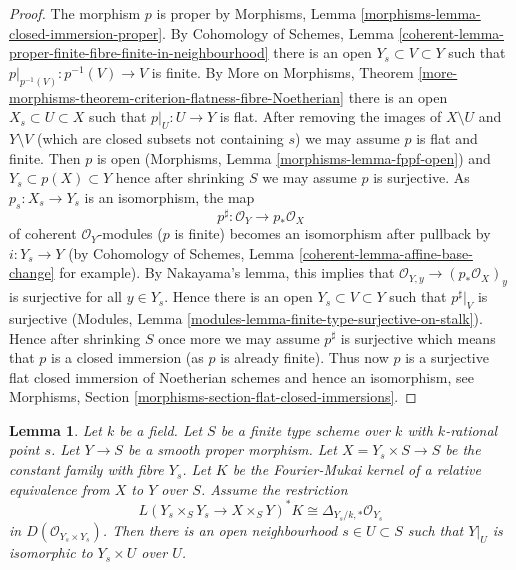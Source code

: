 \documentclass{stacks-project}
\theoremstyle{plain}
\newtheorem{lemma}[subsection]{Lemma}
\theoremstyle{definition}
\theoremstyle{remark}
\numberwithin{equation}{subsection}
\begin{document}
\begin{proof}
The morphism $p$ is proper by Morphisms, Lemma
\ref{morphisms-lemma-closed-immersion-proper}.
By Cohomology of Schemes, Lemma
\ref{coherent-lemma-proper-finite-fibre-finite-in-neighbourhood}
there is an open $Y_s \subset V \subset Y$ such that
$p|_{p^{-1}(V)} : p^{-1}(V) \to V$ is finite.
By More on Morphisms, Theorem
\ref{more-morphisms-theorem-criterion-flatness-fibre-Noetherian}
there is an open $X_s \subset U \subset X$ such that
$p|_U : U \to Y$ is flat. After removing the images of
$X \setminus U$ and $Y \setminus V$ (which are closed subsets
not containing $s$) we may assume $p$ is flat and finite.
Then $p$ is open (Morphisms, Lemma \ref{morphisms-lemma-fppf-open})
and $Y_s \subset p(X) \subset Y$ hence after shrinking $S$
we may assume $p$ is surjective.
As $p_s : X_s \to Y_s$ is an isomorphism, the map
$$
p^\sharp : \mathcal{O}_Y \longrightarrow p_*\mathcal{O}_X
$$
of coherent $\mathcal{O}_Y$-modules ($p$ is finite)
becomes an isomorphism after pullback by $i : Y_s \to Y$
(by Cohomology of Schemes, Lemma
\ref{coherent-lemma-affine-base-change} for example).
By Nakayama's lemma, this implies that
$\mathcal{O}_{Y, y} \to (p_*\mathcal{O}_X)_y$ is surjective
for all $y \in Y_s$. Hence there is an open $Y_s \subset V \subset Y$
such that $p^\sharp|_V$ is surjective
(Modules, Lemma \ref{modules-lemma-finite-type-surjective-on-stalk}).
Hence after shrinking $S$ once more we may assume
$p^\sharp$ is surjective which means that $p$ is a closed
immersion (as $p$ is already finite).
Thus now $p$ is a surjective flat closed immersion
of Noetherian schemes and hence an isomorphism, see
Morphisms, Section \ref{morphisms-section-flat-closed-immersions}.
\end{proof}

\begin{lemma}
\label{lemma-no-deformations}
Let $k$ be a field. Let $S$ be a finite type scheme over $k$
with $k$-rational point $s$. Let $Y \to S$ be a smooth proper morphism.
Let $X = Y_s \times S \to S$ be the constant family with fibre
$Y_s$. Let $K$ be the Fourier-Mukai kernel of a relative equivalence
from $X$ to $Y$ over $S$. Assume the restriction
$$
L(Y_s \times_S Y_s \to X \times_S Y)^*K \cong 
\Delta_{Y_s/k, *} \mathcal{O}_{Y_s}
$$
in $D(\mathcal{O}_{Y_s \times Y_s})$. Then there is an open neighbourhood
$s \in U \subset S$ such that $Y|_U$ is isomorphic to $Y_s \times U$ over $U$.
\end{lemma}
\end{document}
